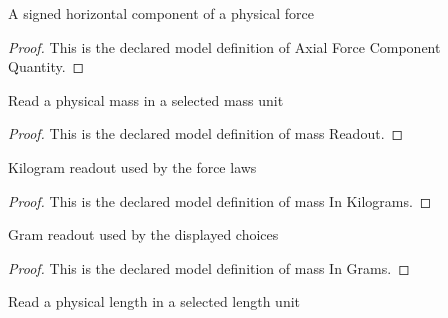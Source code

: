 \begin{definition}
  \label{def:physics:phyx-mini-0906:phyxminiproblems-problemphyxmini0906-axialforcecomponentquantity}
  A signed horizontal component of a physical force
\end{definition}
\begin{proof}
  This is the declared model definition of Axial Force Component Quantity.
\end{proof}
\begin{definition}
  \label{def:physics:phyx-mini-0906:phyxminiproblems-problemphyxmini0906-massreadout}
  Read a physical mass in a selected mass unit
\end{definition}
\begin{proof}
  This is the declared model definition of mass Readout.
\end{proof}
\begin{definition}
  \label{def:physics:phyx-mini-0906:phyxminiproblems-problemphyxmini0906-massinkilograms}
  Kilogram readout used by the force laws
\end{definition}
\begin{proof}
  This is the declared model definition of mass In Kilograms.
\end{proof}
\begin{definition}
  \label{def:physics:phyx-mini-0906:phyxminiproblems-problemphyxmini0906-massingrams}
  Gram readout used by the displayed choices
\end{definition}
\begin{proof}
  This is the declared model definition of mass In Grams.
\end{proof}
\begin{definition}
  \label{def:physics:phyx-mini-0906:phyxminiproblems-problemphyxmini0906-lengthreadout}
  Read a physical length in a selected length unit
\end{definition}
